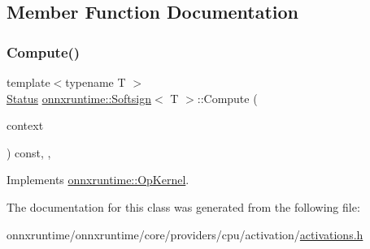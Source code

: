\subsection{Member Function Documentation}
\mbox{\label{classonnxruntime_1_1Softsign_ad327082448c3c2032f761df247fffda9}} 
\subsubsection{\texorpdfstring{Compute()}{Compute()}}
{\footnotesize\ttfamily template$<$typename T $>$ \\
\mbox{\hyperlink{classonnxruntime_1_1common_1_1Status}{Status}} \mbox{\hyperlink{classonnxruntime_1_1Softsign}{onnxruntime\+::\+Softsign}}$<$ T $>$\+::Compute (\begin{DoxyParamCaption}\item[{\mbox{\hyperlink{classonnxruntime_1_1OpKernelContext}{Op\+Kernel\+Context}} $\ast$}]{context }\end{DoxyParamCaption}) const\hspace{0.3cm}{\ttfamily [inline]}, {\ttfamily [override]}, {\ttfamily [virtual]}}



Implements \mbox{\hyperlink{classonnxruntime_1_1OpKernel_a9eca8656a78b1b3ab9d3351a12798650}{onnxruntime\+::\+Op\+Kernel}}.



The documentation for this class was generated from the following file\+:\begin{DoxyCompactItemize}
\item 
onnxruntime/onnxruntime/core/providers/cpu/activation/\mbox{\hyperlink{cpu_2activation_2activations_8h}{activations.\+h}}\end{DoxyCompactItemize}
